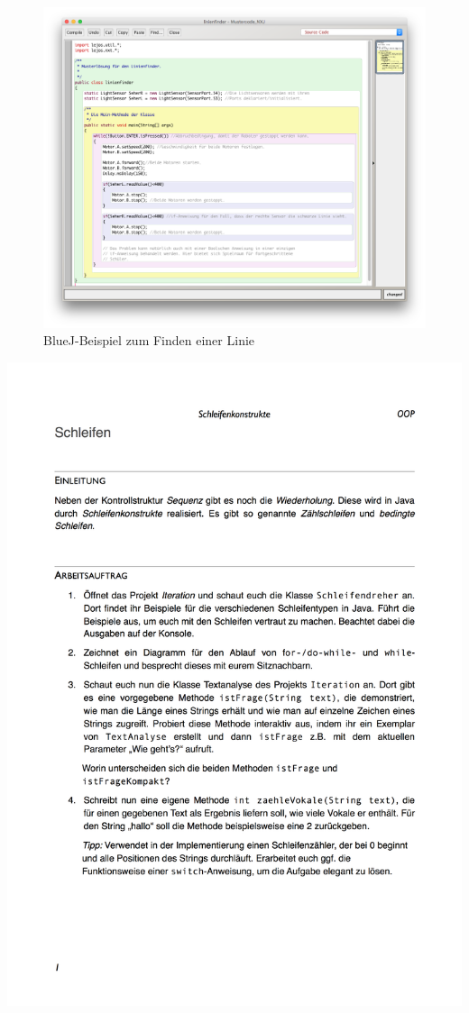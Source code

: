 \documentclass[paper=a4, DIV=13, BCOR=12mm, twoside=on, onecolumn=on, open = any, titlepage =on, parskip =half-, headsepline = on, footsepline = on, chapterprefix = on, sectionprefix = on, appendixprefix = off, fontsize = 11pt, numbers = noenddot, abstract = off]{scrreprt}
\begin{document}
\begin{figure}[htb]
\centering
\includegraphics[width=\textwidth]{images/linienfinder_bluej.png} 
\caption{BlueJ-Beispiel zum Finden einer Linie}
\label{fig:Bsp BlueJ Linienfinder}
\end{figure}




\newpage

\newpage


\includegraphics[height=\textheight]{images/AB_Schleifenkonstrukte.png}
\end{document}
